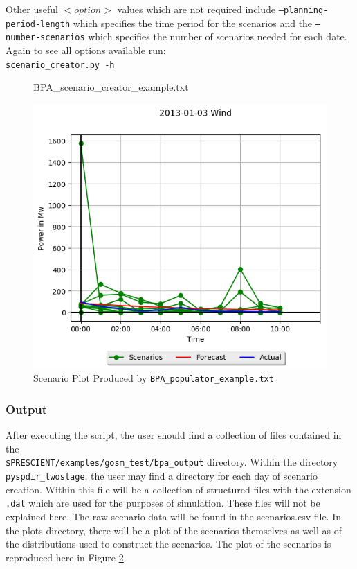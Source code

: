 \documentclass[11pt]{article}
\begin{document}
Other useful $<option>$ values which are not required include \texttt{--planning-period-length} which specifies the time period for the scenarios and the \texttt{--number-scenarios} which specifies the number of scenarios needed for each date. Again to see all options available run: \\ \texttt{scenario\_creator.py -h}

\begin{figure}
	\begin{framed}
		
	\end{framed}
	\caption{BPA\_scenario\_creator\_example.txt}
	\label{fig:BPA_scenario_creator_example}
\end{figure}

\begin{figure}[h]
	\includegraphics{Wind_example.png}
	\caption{Scenario Plot Produced by \texttt{BPA\_populator\_example.txt}}
	\label{plots}
\end{figure}


\subsubsection{Output}
After executing the script, the user should find a collection of files contained in the \\ \texttt{\$PRESCIENT/examples/gosm\_test/bpa\_output} directory. Within the directory \texttt{pyspdir\_twostage}, the user may find a directory for each day of scenario creation. Within this file will be a collection of structured files with the extension \texttt{.dat} which are used for the purposes of simulation. These files will not be explained here. The raw scenario data will be found in the scenarios.csv file. In the plots directory, there will be a plot of the scenarios themselves as well as of the distributions used to construct the scenarios. The plot of the scenarios is reproduced here in Figure \ref{plots}.
\end{document}
